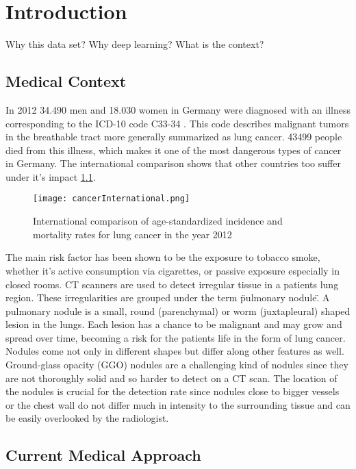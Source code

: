 \documentclass[main.tex]{subfiles}
\begin{document}
\chapter{Introduction}
Why this data set?
Why deep learning?
What is the context?

\section{Medical Context}
In 2012 34.490 men and 18.030 women in Germany were diagnosed with an illness corresponding to the ICD-10 code C33-34 \cite{koch2015krebs}. This code describes malignant tumors in the breathable tract more generally summarized as lung cancer. 43499 people died from this illness, which makes it one of the most dangerous types of cancer in Germany. The international comparison shows that other countries too suffer under it's impact \ref{fig:cancInt}.

\begin{figure}[ht]
\texttt{[image: cancerInternational.png]}
\caption{International comparison of age-standardized incidence and mortality rates for lung cancer in the year 2012}
\label{fig:cancInt}
\end{figure}

The main risk factor has been shown to be the exposure to tobacco smoke, whether it's active consumption via cigarettes, or passive exposure especially in closed rooms. CT scanners are used to detect irregular tissue in a patients lung region. These irregularities are grouped under the term \"pulmonary nodule\". A pulmonary nodule is a small, round (parenchymal) or worm (juxtapleural) shaped lesion in the lungs. Each lesion has a chance to be malignant and may grow and spread over time, becoming a risk for the patients life in the form of lung cancer. Nodules come not only in different shapes but differ along other features as well. Ground-glass opacity (GGO) nodules are a challenging kind of nodules since they are not thoroughly solid and so harder to detect on a CT scan. The location of the nodules is crucial for the detection rate since nodules close to bigger vessels or the chest wall do not differ much in intensity to the surrounding tissue and can be easily overlooked by the radiologist.



\section{Current Medical Approach}
\end{document}
